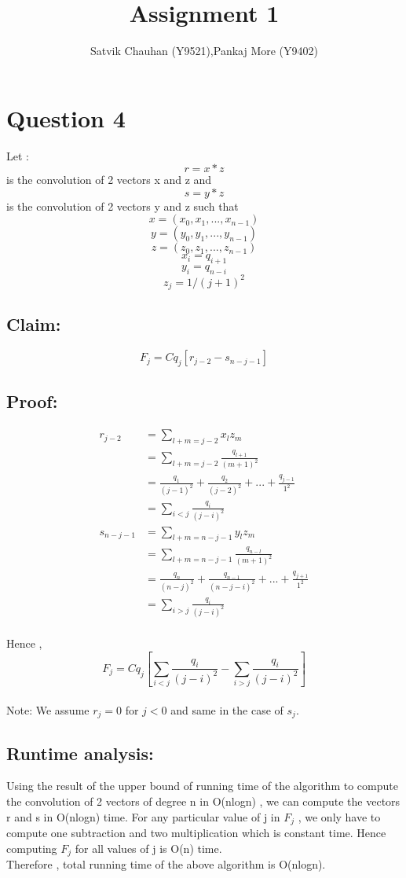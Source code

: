 \documentclass{article}
\title{Assignment 1}
\author{Satvik Chauhan (Y9521),Pankaj More (Y9402)}
\date{}
\begin{document}
\maketitle
\section{Question 4}
Let : 
\[r = x * z \] is the convolution of 2 vectors x and z and \\
\[s = y * z \] is the convolution of 2 vectors y and z such that
\[x = (x_{0},x_{1},...,x_{n-1})\]
\[y = (y_{0},y_{1},...,y_{n-1})\]
\[z = (z_{0},z_{1},...,z_{n-1})\]
\[x_{i} = q_{i+1}\]
\[y_{i} = q_{n-i}\]
\[z_{j} = 1/(j+1)^2\]

\subsection*{Claim:} \[F_j = Cq_j[r_{j-2} - s_{n-j-1}]\]

\subsection*{Proof:}
\begin{align*}
r_{j-2} & = \sum_{l+m=j-2} x_lz_m \\
&= \sum_{l+m=j-2} \frac{q_{l+1}}{(m+1)^2} \\
&= \frac{q_1}{(j-1)^2} + \frac{q_2}{(j-2)^2} + ... + \frac{q_{j-1}}{1^2} \\
&= \sum_{i<j} \frac{q_i}{(j-i)^2} \\
s_{n-j-1} & = \sum_{l+m=n-j-1} y_lz_m \\
&= \sum_{l+m=n-j-1} \frac{q_{n-l}}{(m+1)^2} \\
&= \frac{q_n}{(n-j)^2} + \frac{q_{n-1}}{(n-j-i)^2} + ... + \frac{q_{j+1}}{1^2} \\
&= \sum_{i>j} \frac{q_i}{(j-i)^2} \\ 
\end{align*}

Hence , 
\[F_j = Cq_j[\sum_{i<j} \frac{q_{i}}{(j-i)^2} - \sum_{i>j} \frac{q_{i}}{(j-i)^2}  ]\] 
\\
Note: We assume $r_j = 0$ for $j < 0$ and same in the case of $s_j$.

\subsection*{Runtime analysis:}
Using the result of the upper bound of running time of the algorithm to compute the convolution of 2 vectors of degree n in O(nlogn) , we can compute the vectors r and s in O(nlogn) time.
For any particular value of j in $F_j$ , we only have to compute one subtraction and two multiplication which is constant time. Hence computing $F_j$ for all values of j is O(n) time. \\
Therefore , total running time of the above algorithm is O(nlogn).
\end{document}

